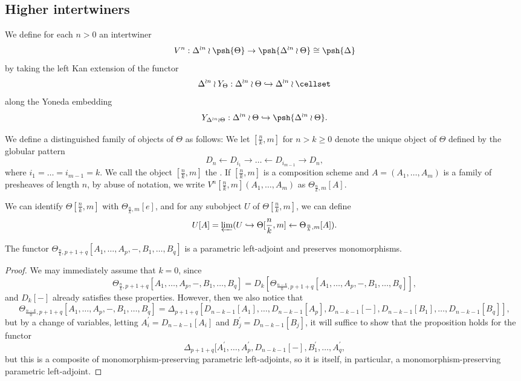 \subsection{Higher intertwiners}
\begin{defn} We define for each \(n>0\) an intertwiner \[V^n:\Delta^{\wr n}\wr \psh{\Theta}\to \psh{\Delta^{\wr n}\wr\Theta}\cong \psh{\Delta}\] by taking the left Kan extension of the functor \[\Delta^{\wr n}\wr Y_\Theta:\Delta^{\wr n}\wr \Theta \hookrightarrow \Delta^{\wr n}\wr \cellset\] along the Yoneda embedding\[Y_{\Delta^{\wr n}\wr \Theta}:\Delta^{\wr n}\wr \Theta \hookrightarrow\psh{\Delta^{\wr n}\wr \Theta}.\]  
\end{defn}
\begin{defn} We define a distinguished family of objects of \(\Theta\) as follows: We let \([\frac{n}{k},m]\) for \(n>k\geq 0\) denote the unique object of \(\Theta\) defined by the globular pattern
\[D_{n}\leftarrow D_{i_1}\to \dots \leftarrow D_{i_{m-1}} \to D_{n},\] where \(i_1=\dots=i_{m-1}=k\).  We call the object \([\frac{n}{k},m]\) the .  If \([\frac{n}{k},m]\) is a composition scheme and \(A=(A_1,\dots,A_m)\) is a family of presheaves of length \(n\), by abuse of notation, we write \(V^n[\frac{n}{k},m](A_1,\dots,A_m)\) as \(\Theta_{\frac{n}{k},m}[A]\).    

We can identify \(\Theta[\frac{n}{k},m]\) with \(\Theta_{\frac{n}{k},m}[e]\), and for any subobject \(U\) of \(\Theta[\frac{n}{k},m]\), we can define \[U[A]=\varprojlim(U \hookrightarrow \Theta[\frac{n}{k},m] \leftarrow \Theta_{\frac{n}{k},m}[A]).\]
\end{defn}

\begin{prop} The functor \(\Theta_{\frac{n}{k},p+1+q}[A_1,\dots,A_p,-,B_1,\dots,B_q]\) is a parametric left-adjoint and preserves monomorphisms.
\end{prop}
\begin{proof} We may immediately assume that \(k=0\), since \[\Theta_{\frac{n}{k},p+1+q}[A_1,\dots,A_p,-,B_1,\dots,B_q]=D_k[\Theta_{\frac{n-k}{0},p+1+q}[A_1,\dots,A_p,-,B_1,\dots,B_q]],\] and \(D_k[-]\) already satisfies these properties.  However, then we also notice that \[\Theta_{\frac{n-k}{0},p+1+q}[A_1,\dots,A_p,-,B_1,\dots,B_q]=\Delta_{p+1+q}[D_{n-k-1}[A_1],\dots, D_{n-k-1}[A_p], D_{n-k-1}[-], D_{n-k-1}[B_1],\dots, D_{n-k-1}[B_q]],\] but by a change of variables, letting \(A^\prime_i=D_{n-k-1}[A_i]\) and \(B^\prime_j=D_{n-k-1}[B_j]\), it will suffice to show that the proposition holds for the functor \[\Delta_{p+1+q}[A^\prime_1,\dots,A^\prime_p,D_{n-k-1}[-],B^\prime_1,\dots, A^\prime_q,\] but this is a composite of monomorphism-preserving parametric left-adjoints, so it is itself, in particular, a monomorphism-preserving parametric left-adjoint.
\end{proof}
